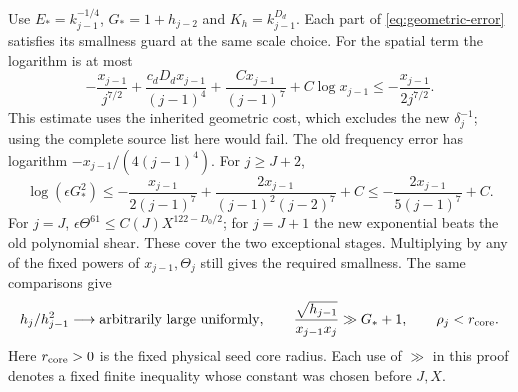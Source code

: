 Use $E_*=k_{j-1}^{-1/4}$, $G_*=1+h_{j-2}$ and
$K_h=k_{j-1}^{D_d}$. Each part of \eqref{eq:geometric-error} satisfies
its smallness guard at the same scale choice. For the spatial term the
logarithm is at most
\[
 -\frac{x_{j-1}}{j^{7/2}}+
       \frac{c_dD_dx_{j-1}}{(j-1)^4}
       +\frac{Cx_{j-1}}{(j-1)^7}+C\log x_{j-1}
 \leq-\frac{x_{j-1}}{2j^{7/2}}.
\]
This estimate uses the inherited geometric cost, which excludes the new
$\delta_j^{-1}$; using the complete source list here would fail.
The old frequency error has logarithm
$-x_{j-1}/(4(j-1)^4)$. For $j\geq J+2$,
\[
 \log(\epsilon G_*^2)\leq
 -\frac{x_{j-1}}{2(j-1)^7}+
 \frac{2x_{j-1}}{(j-1)^2(j-2)^7}+C
 \leq-\frac{2x_{j-1}}{5(j-1)^7}+C.
\]
For $j=J$, $\epsilon\Theta^{61}\leq C(J)X^{122-D_0/2}$;
for $j=J+1$ the new exponential beats the old polynomial shear.
These cover the two exceptional stages. Multiplying by any of the
fixed powers of $x_{j-1},\Theta_j$ still gives the required smallness.
The same comparisons give
\begin{equation}\label{eq:shear-separation}
 h_j/h_{j-1}^2\longrightarrow\text{arbitrarily large uniformly},\qquad
 \frac{\sqrt{h_{j-1}}}{x_{j-1}x_j}\gg G_*+1,\qquad
 \rho_j<r_{\rm core}.
\end{equation}
Here $r_{\rm core}>0$ is the fixed physical seed core radius.
Each use of $\gg$ in this proof denotes a fixed finite inequality whose
constant was chosen before $J,X$.

